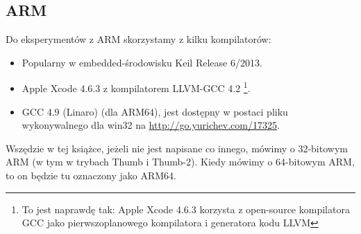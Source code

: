 \subsection{ARM}
\label{sec:hw_ARM}

\myindex{\idevices}
Do eksperymentów z ARM skorzystamy z kilku kompilatorów:

\begin{itemize}
\item Popularny w embedded-środowisku Keil Release 6/2013.

\item Apple Xcode 4.6.3 z kompilatorem LLVM-GCC 4.2
\footnote{To jest naprawdę tak: Apple Xcode 4.6.3 korzysta z open-source kompilatora GCC jako pierwszoplanowego kompilatora i generatora kodu LLVM}.

\item GCC 4.9 (Linaro) (dla ARM64), 
jest dostępny w postaci pliku wykonywalnego dla win32 na \url{http://go.yurichev.com/17325}.

\end{itemize}

Wszędzie w tej książce, jeżeli nie jest napisane co innego, mówimy o 32-bitowym ARM (w tym w trybach Thumb i Thumb-2).
Kiedy mówimy o 64-bitowym ARM, to on będzie tu oznaczony jako ARM64.








